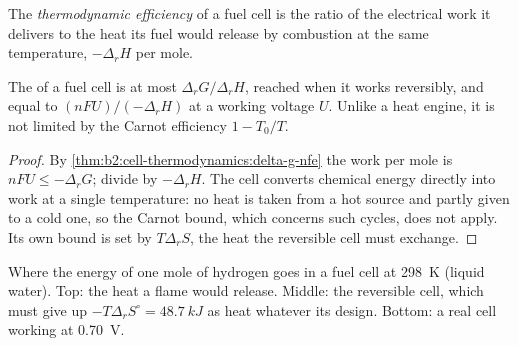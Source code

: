 \begin{definition}\label{def:b2:cell-thermodynamics:efficiency}
The \emph{thermodynamic efficiency} of a fuel
cell is the ratio of the electrical work it delivers to the heat its fuel
would release by combustion at the same temperature, $-\Delta_r H$ per mole.
\end{definition}

\begin{proposition}\label{prop:b2:cell-thermodynamics:efficiency}
The  of a fuel cell is at most $\Delta_r G/\Delta_r H$,
reached when it works reversibly, and equal to $(nFU)/(-\Delta_r H)$ at a working
voltage $U$. Unlike a heat engine, it is not limited by the Carnot efficiency
$1 - T_0/T$.
\end{proposition}

\begin{proof}
By \cref{thm:b2:cell-thermodynamics:delta-g-nfe} the work per mole is $nFU \leq
-\Delta_r G$; divide by $-\Delta_r H$. The cell converts chemical energy directly
into work at a single temperature: no heat is taken from a hot source and
partly given to a cold one, so the Carnot bound, which concerns such cycles,
does not apply. Its own bound is set by $T\Delta_r S$, the heat the reversible
cell must exchange.
\end{proof}

\begin{omfigure}

{\small Where the energy of one mole of hydrogen goes in a fuel cell at
\qty{298}{K} (liquid water). Top: the heat a flame would release. Middle: the
reversible cell, which must give up $-T\Delta_r S^\circ = \qty{48.7}{kJ}$ as heat
whatever its design. Bottom: a real cell working at \qty{0.70}{V}.}
\end{omfigure}

